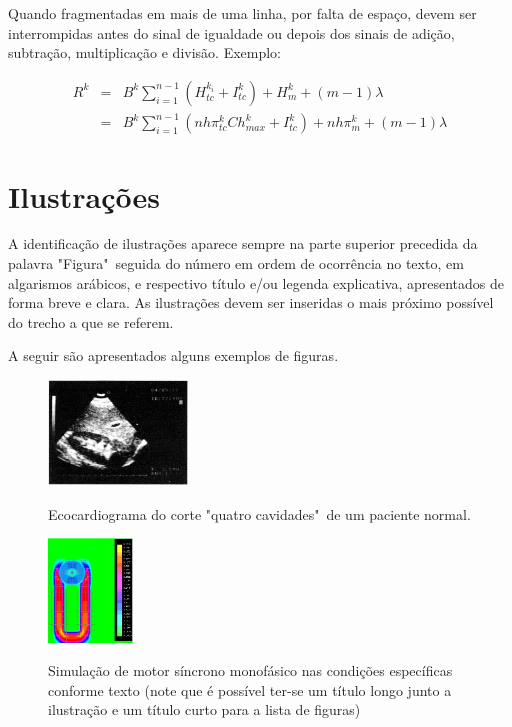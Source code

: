 \documentclass[repeatfields,xlists,xpacks,oneside]{ufrgscca}
\begin{document}
Quando fragmentadas em mais de uma linha, por falta de espaço, devem ser
interrompidas antes do sinal de igualdade ou depois dos sinais de adição,
subtração, multiplicação e divisão. Exemplo:

\begin{eqnarray}
R^k &=& B^k \sum_{i=1}^{n-1}{\left(H_{tc}^{k_i}+I_{tc}^k\right)}+H_m^k+(m-1)\lambda \nonumber\\
&=& B^k \sum_{i=1}^{n-1}{\left(nh\pi_{tc}^kCh_{max}^k+I_{tc}^k\right)}+nh\pi_m^k+(m-1)\lambda
\end{eqnarray}


\section{Ilustrações}

A identificação de ilustrações aparece sempre na parte superior precedida da
palavra "Figura"\ seguida do número em ordem de ocorrência no texto, em
algarismos arábicos, e respectivo título e/ou legenda explicativa,
apresentados de forma breve e clara. As ilustrações devem ser inseridas o
mais próximo possível do trecho a que se referem.

A seguir são apresentados alguns exemplos de figuras.

\begin{figure}[htbp]
{
  \centering
  \caption{Ecocardiograma do corte "quatro cavidades"\ de um paciente normal.}
  \includegraphics[width=0.33\textwidth]{eco}\\
}
{}
\end{figure}

\begin{figure}[htbp]
{
  \centering
  \caption[Simulação de motor síncrono monofásico.]{Simulação de motor síncrono monofásico nas condições específicas conforme texto (note que é possível ter-se um título longo junto a ilustração e um título curto para a lista de figuras)}
  \includegraphics[width=0.2\textwidth]{motor}\\
}
{}
\end{figure}
\end{document}
